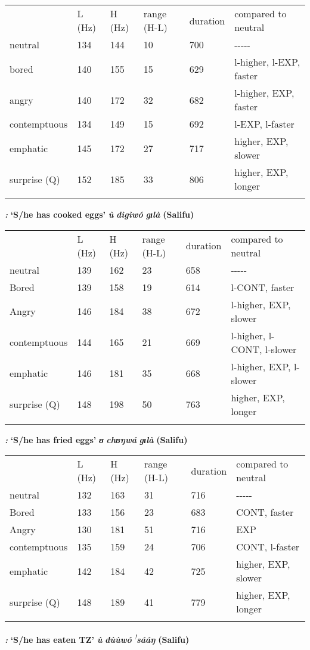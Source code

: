 \documentclass[output=paper]{langsci/langscibook}
\begin{document}
\begin{tabular}{llllll} & L (Hz) & H (Hz) & range (H-L) & duration & compared to neutral\\
\lsptoprule
neutral & 134 & 144 & 10 & 700 & {}-{}-{}-{}-{}-\\
bored & 140 & 155 & 15 & 629 & l-higher, l-EXP, faster\\
angry & 140 & 172 & 32 & 682 & l-higher, EXP, faster\\
contemptuous & 134 & 149 & 15 & 692 & l-EXP, l-faster\\
emphatic & 145 & 172 & 27 & 717 & higher, EXP, slower\\
surprise (Q) & 152 & 185 & 33 & 806 & higher, EXP, longer\\
\lspbottomrule
\end{tabular}
\textbf{ }\emph{\textbf{\textup{:}}}\textbf{ ‘}\textbf{S/he has cooked eggs’  }\emph{\textbf{ù}}\emph{\textbf{ dìgì}}\emph{\textbf{wó}}\emph{\textbf{ gɪlà}}\textbf{  (Salifu)}

\begin{tabular}{llllll} & L (Hz) & H (Hz) & range (H-L) & duration & compared to neutral\\
\lsptoprule
neutral & 139 & 162 & 23 & 658 & {}-{}-{}-{}-{}-\\
Bored & 139 & 158 & 19 & 614 & l-CONT, faster\\
Angry & 146 & 184 & 38 & 672 & l-higher, EXP, slower\\
contemptuous & 144 & 165 & 21 & 669 & l-higher, l-CONT, l-slower\\
emphatic & 146 & 181 & 35 & 668 & l-higher, EXP, l-slower\\
surprise (Q) & 148 & 198 & 50 & 763 & higher, EXP, longer\\
\lspbottomrule
\end{tabular}
\emph{\textbf{\textup{:}}}\textbf{ ‘S}\textbf{/he has fried eggs’   }\emph{\textbf{ʊ}}\emph{\textbf{ chʊŋ}}\emph{\textbf{wá}}\emph{\textbf{ gɪlà}}\textbf{  (Salifu)}

\begin{tabular}{llllll} & L (Hz) & H (Hz) & range (H-L) & duration & compared to neutral\\
\lsptoprule
neutral & 132 & 163 & 31 & 716 & {}-{}-{}-{}-{}-\\
Bored & 133 & 156 & 23 & 683 & CONT, faster\\
Angry & 130 & 181 & 51 & 716 & EXP\\
contemptuous & 135 & 159 & 24 & 706 & CONT, l-faster\\
emphatic & 142 & 184 & 42 & 725 & higher, EXP, slower\\
surprise (Q) & 148 & 189 & 41 & 779 & higher, EXP, longer\\
\lspbottomrule
\end{tabular}
\emph{\textbf{\textup{:}}}\textbf{ ‘S}\textbf{/he has eaten TZ’  }\emph{\textbf{ù}}\emph{\textbf{ dùù}}\emph{\textbf{wó}}\emph{\textbf{ }}\textit{\textsuperscript{!}}\emph{\textbf{sááŋ}}\textbf{  (Salifu)}
\end{document}
